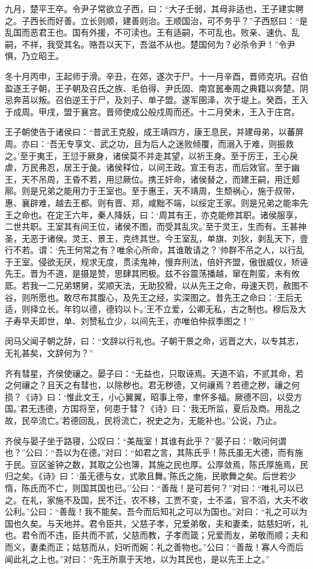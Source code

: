 \documentclass[]{article}
\begin{document}
九月，楚平王卒。令尹子常欲立子西，曰：``大子壬弱，其母非适也，王子建实聘之。子西长而好善。立长则顺，建善则治。王顺国治，可不务乎？''子西怒曰：``是乱国而恶君王也。国有外援，不可渎也。王有适嗣，不可乱也。败亲、速仇、乱嗣，不祥，我受其名。赂吾以天下，吾滋不从也。楚国何为？必杀令尹！''令尹惧，乃立昭王。

冬十月丙申，王起师于滑。辛丑，在郊，遂次于尸。十一月辛酉，晋师克巩。召伯盈逐王子朝，王子朝及召氏之族、毛伯得、尹氏固、南宫嚚奉周之典籍以奔楚。阴忌奔莒以叛。召伯逆王于尸，及刘子、单子盟。遂军圉泽，次于堤上。癸酉，王入于成周。甲戌，盟于襄宫。晋师使成公般戍周而还。十二月癸未，王入于庄宫。

王子朝使告于诸侯曰：``昔武王克殷，成王靖四方，康王息民，并建母弟，以蕃屏周。亦曰：`吾无专享文、武之功，且为后人之迷败倾覆，而溺入于难，则振救之。'至于夷王，王愆于厥身，诸侯莫不并走其望，以祈王身。至于厉王，王心戾虐，万民弗忍，居王于彘。诸侯释位，以间王政。宣王有志，而后效官。至于幽王，天不吊周，王昏不若，用愆厥位。携王奸命，诸侯替之，而建王嗣，用迁郏鄏。则是兄弟之能用力于王室也。至于惠王，天不靖周，生颓祸心，施于叔带，惠、襄辟难，越去王都。则有晋、郑，咸黜不端，以绥定王家。则是兄弟之能率先王之命也。在定王六年，秦人降妖，曰：`周其有王，亦克能修其职。诸侯服享，二世共职。王室其有间王位，诸侯不图，而受其乱灾。'至于灵王，生而有。王甚神圣，无恶于诸侯。灵王、景王，克终其世。今王室乱，单旗、刘狄，剥乱天下，壹行不若。谓：`先王何常之有？唯余心所命，其谁敢请之？'帅群不吊之人，以行乱于王室。侵欲无厌，规求无度，贯渎鬼神，慢弃刑法，倍奸齐盟，傲很威仪，矫诬先王。晋为不道，是摄是赞，思肆其罔极。兹不谷震荡播越，窜在荆蛮，未有攸厎。若我一二兄弟甥舅，奖顺天法，无助狡猾，以从先王之命，毋速天罚，赦图不谷，则所愿也。敢尽布其腹心，及先王之经，实深图之。昔先王之命曰：`王后无适，则择立长。年钧以德，德钧以卜。'王不立爱，公卿无私，古之制也。穆后及大子寿早夭即世，单、刘赞私立少，以间先王，亦唯伯仲叔季图之！''

闵马父闻子朝之辞，曰：``文辞以行礼也。子朝干景之命，远晋之大，以专其志，无礼甚矣，文辞何为？''

齐有彗星，齐侯使禳之。晏子曰：``无益也，只取诬焉。天道不谄，不贰其命，若之何禳之？且天之有彗也，以除秽也。君无秽德，又何禳焉？若德之秽，禳之何损？《诗》曰：`惟此文王，小心翼翼，昭事上帝，聿怀多福。厥德不回，以受方国。'君无违德，方国将至，何患于彗？《诗》曰：`我无所监，夏后及商。用乱之故，民卒流亡。'若德回乱，民将流亡，祝史之为，无能补也。''公说，乃止。

齐侯与晏子坐于路寝，公叹曰：``美哉室！其谁有此乎？''晏子曰：``敢问何谓也？''公曰：``吾以为在德。''对曰：``如君之言，其陈氏乎！陈氏虽无大德，而有施于民。豆区釜钟之数，其取之公也簿，其施之民也厚。公厚敛焉，陈氏厚施焉，民归之矣。《诗》曰：`虽无德与女，式歌且舞。'陈氏之施，民歌舞之矣。后世若少惰，陈氏而不亡，则国其国也已。''公曰：``善哉！是可若何？''对曰：``唯礼可以已之。在礼，家施不及国，民不迁，农不移，工贾不变，士不滥，官不滔，大夫不收公利。''公曰：``善哉！我不能矣。吾今而后知礼之可以为国也。''对曰：``礼之可以为国也久矣。与天地并。君令臣共，父慈子孝，兄爱弟敬，夫和妻柔，姑慈妇听，礼也。君令而不违，臣共而不贰，父慈而教，子孝而箴；兄爱而友，弟敬而顺；夫和而义，妻柔而正；姑慈而从，妇听而婉：礼之善物也。''公曰：``善哉！寡人今而后闻此礼之上也。''对曰：``先王所禀于天地，以为其民也，是以先王上之。''
\end{document}
